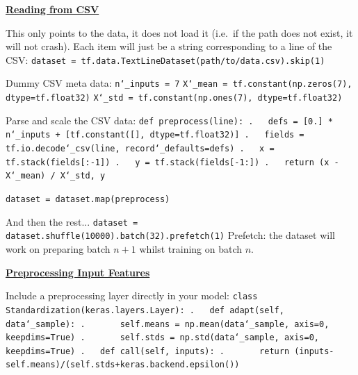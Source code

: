 \textbf{\underline{Reading from CSV}}

This only points to the data, it does not load it (i.e.~if the path does not exist, it will not crash).\newline
Each item will just be a string corresponding to a line of the CSV:\newline
\texttt{dataset = tf.data.TextLineDataset(\textquotesingle path/to/data.csv\textquotesingle).skip(1)}

Dummy CSV meta data:\newline
\texttt{n\char`_inputs = 7}\newline
\texttt{X\char`_mean = tf.constant(np.zeros(7), dtype=tf.float32)}\newline
\texttt{X\char`_std = tf.constant(np.ones(7), dtype=tf.float32)}

Parse and scale the CSV data:\newline
\texttt{def preprocess(line):\newline
.~~~defs = [0.]~* n\char`_inputs + [tf.constant([], dtype=tf.float32)]\newline
.~~~fields = tf.io.decode\char`_csv(line, record\char`_defaults=defs)\newline
.~~~x = tf.stack(fields[:-1])\newline
.~~~y = tf.stack(fields[-1:])\newline
.~~~return (x - X\char`_mean) / X\char`_std, y}

\texttt{dataset = dataset.map(preprocess)}

And then the rest...\newline
\texttt{dataset = dataset.shuffle(10000).batch(32).prefetch(1)}\newline
Prefetch: the dataset will work on preparing batch $n+1$ whilst training on batch $n$.

\newpage
\textbf{\underline{Preprocessing Input Features}}

Include a preprocessing layer directly in your model:\newline
\texttt{class Standardization(keras.layers.Layer):\newline
.~~~def adapt(self, data\char`_sample):\newline
.~~~~~~~self.means = np.mean(data\char`_sample, axis=0, keepdims=True)\newline
.~~~~~~~self.stds = np.std(data\char`_sample, axis=0, keepdims=True)\newline
.~~~def call(self, inputs):\newline
.~~~~~~~return (inputs-self.means)/(self.stds+keras.backend.epsilon())}


